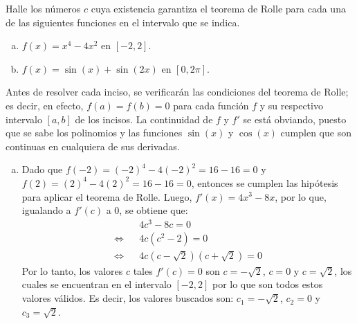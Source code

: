 \begin{enunciado}
 Halle los n\'umeros $c$ cuya existencia garantiza el teorema de Rolle para cada una de las siguientes funciones en el intervalo que se indica.
 \begin{enumerate}[(a)]
  \item $f(x) = x^4 - 4x^2$ en $[-2,2]$.
  \item $f(x) = \sin(x) + \sin(2x)$ en $[0,2\pi]$.
 \end{enumerate}
\end{enunciado}

\begin{solucion}
 Antes de resolver cada inciso, se verificar\'an las condiciones del teorema de Rolle; es decir, en efecto, $f(a) = f(b) = 0$ para cada funci\'on $f$ y su respectivo intervalo $[a,b]$ de los incisos. La continuidad de $f$ y $f'$ se est\'a obviando, puesto que se sabe los polinomios y las funciones $\sin(x)$ y $\cos(x)$ cumplen que son continuas en cualquiera de sus derivadas.
 \begin{enumerate}[(a)]
  \item Dado que $f(-2) = (-2)^4 - 4(-2)^2 = 16 - 16 = 0$ y $f(2) = (2)^4 - 4(2)^2 = 16 - 16 = 0$, entonces se cumplen las hip\'otesis para aplicar el teorema de Rolle. Luego, $f'(x) = 4x^3 - 8x$, por lo que, igualando a $f'(c)$ a $0$, se obtiene que:
  \begin{eqnarray*}
   & & 4c^3 - 8c = 0 \\
   \Leftrightarrow & & 4c(c^2 - 2) = 0 \\
   \Leftrightarrow & & 4c(c-\sqrt{2})(c+\sqrt{2}) = 0
  \end{eqnarray*}
  Por lo tanto, los valores $c$ tales $f'(c) = 0$ son $c = -\sqrt{2}$, $c= 0$ y $c = \sqrt{2}$, los cuales se encuentran en el intervalo $[-2,2]$ por lo que son todos estos valores v\'alidos.
  Es decir, los valores buscados son: $c_1 = -\sqrt{2}$, $c_2 = 0$ y $c_3 = \sqrt{2}$.
  

\end{enumerate}
\end{solucion}
